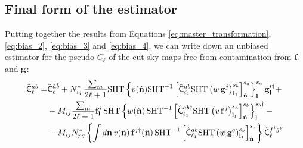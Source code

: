 \documentclass[a4paper,10pt]{article}
\newcommand{\nv}{\hat{\bf n}}
\begin{document}
  \subsection{Final form of the estimator}
    Putting together the results from Equations \ref{eq:master_transformation}, \ref{eq:bias_2}, \ref{eq:bias_3} and \ref{eq:bias_4}, we can write down an unbiased estimator for the pseudo-$C_\ell$ of the cut-sky maps free from contamination from ${\bf f}$ and ${\bf g}$:
    \begin{align}\nonumber
      \tilde{\sf C}^{ab}_\ell=&\tilde{\sf C}^{\tilde{a}\tilde{b}}_\ell+N^*_{ij}\,\frac{\sum_m}{2\ell+1}{\rm SHT}\left\{v(\nv){\rm SHT}^{-1}\left[\hat{\sf C}^{ab}_{\ell_1}{\rm SHT}\left(w\,{\bf g}^j\right)^{s_b}_{{\bf l}_1}\right]^{s_a}_{\nv}\right\}^{s_a}_{\bf l}{\bf g}^{i\dag}_{\bf l}+\\\nonumber
      &+M_{ij}\frac{\sum_{m}}{2\ell+1}{\bf f}^i_{\bf l}\,{\rm SHT}\left\{w(\nv)\,{\rm SHT}^{-1}\left[\hat{\sf C}^{ab\dag}_{\ell_1}{\rm SHT}\left(v\,{\bf f}^j\right)^{s_a}_{{\bf l}_1}\right]^{s_b}_{\nv}\right\}^{s_b\dag}_{\bf l}-\\
      &-M_{ij}N^*_{pq}\left\{\int d\nv\,v(\nv)\,{\bf f}^{j\dag}(\nv)\,{\rm SHT}^{-1}\left[\hat{\sf C}^{ab}_{\ell_1}{\rm SHT}\left(w\,{\bf g}^q\right)^{s_b}_{{\bf l}_1}\right]^{s_a}_{\nv}\right\}\tilde{\sf C}^{f^ig^p}_\ell
    \end{align}
\end{document}
